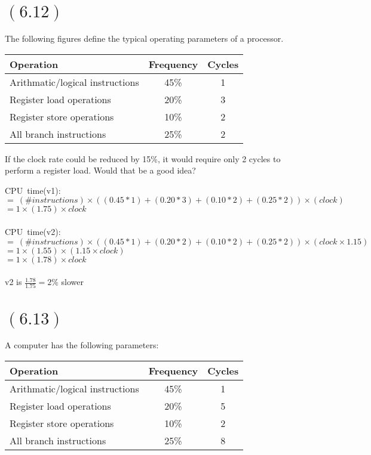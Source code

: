 \documentclass[letterpaper,12pt,titlepage]{article}
\begin{document}
\section*{$(6.12)$} The following figures define the typical operating parameters of a processor.\\
\begin{center}
\begin{tabular}{l | c | c}
\textbf{Operation} & \textbf{Frequency} & \textbf{Cycles}\\ \hline
Arithmatic/logical instructions& 45\% & 1\\
Register load operations& 20\% & 3\\
Register store operations& 10\% & 2\\
All branch instructions& 25\% & 2 \\
\end{tabular}
\end{center}

If the clock rate could be reduced by 15\%, it would require only 2 cycles to perform a register load. Would that be a good idea?
\begin{mdframed}[style=MyFrame]

CPU~time(v1):\\
$=~(\# instructions)\times ((0.45*1)+(0.20*3)+(0.10*2)+(0.25*2))\times (clock)$\\
$=1\times(1.75)\times clock$ \\ \\
CPU~time(v2):\\
$=~(\# instructions)\times ((0.45*1)+(0.20*2)+(0.10*2)+(0.25*2))\times (clock \times 1.15)$\\
$=1\times(1.55)\times (1.15\times clock)$ \\
$=1\times(1.78)\times clock$ \\ \\
v2 is $\frac{1.78}{1.75} = 2\% $ slower
\end{mdframed}

\section*{$(6.13)$} A computer has the following parameters:\\
\begin{center}
\begin{tabular}{l | c | c}
\textbf{Operation} & \textbf{Frequency} & \textbf{Cycles}\\ \hline
Arithmatic/logical instructions& 45\% & 1\\
Register load operations& 20\% & 5\\
Register store operations& 10\% & 2\\
All branch instructions& 25\% & 8 \\
\end{tabular}
\end{center}
\end{document}
